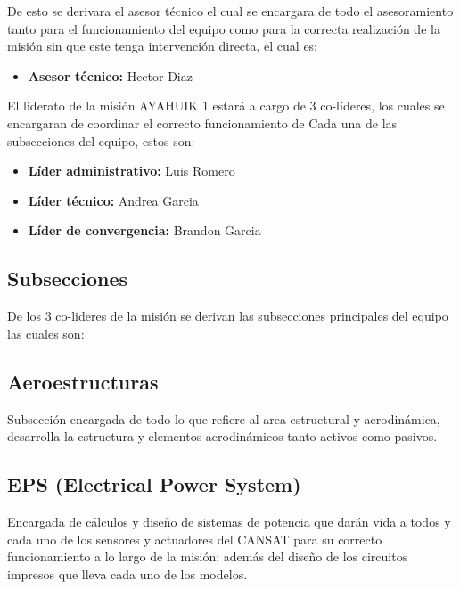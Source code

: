 \documentclass[letterpaper,12pt]{article} %
\begin{document}
    De esto se derivara el asesor técnico el cual se encargara de todo el asesoramiento tanto para el funcionamiento del equipo
    como para la correcta realización de la misión sin que este tenga intervención directa, el cual es:

    \begin{itemize}
        \item \textbf{Asesor técnico:} Hector Diaz

    \end{itemize}


    \vspace{5mm}

    El liderato de la misión AYAHUIK 1 estará a cargo de 3 co-líderes,
    los cuales se encargaran de coordinar el correcto funcionamiento de Cada
    una de las subsecciones del equipo, estos son:

    \begin{itemize}
        \item \textbf{Líder administrativo:} Luis Romero
        \item \textbf{Líder técnico:} Andrea Garcia
        \item \textbf{Líder de convergencia:} Brandon Garcia
    
    \end{itemize}

    \subsection{Subsecciones}
    De los 3 co-lideres de la misión se derivan las subsecciones principales del equipo las cuales son:
    
    \subsection*{Aeroestructuras}

    Subsección encargada de todo lo que refiere al area estructural y aerodinámica, desarrolla la estructura y elementos aerodinámicos tanto activos como pasivos.
    
    \subsection*{EPS (Electrical Power System)}

    Encargada de cálculos y diseño de sistemas de potencia que darán vida a todos y cada uno de los sensores y actuadores del CANSAT para su correcto funcionamiento a lo largo de la misión; además del diseño de los circuitos impresos que lleva cada uno de los modelos.
    
\end{document}
